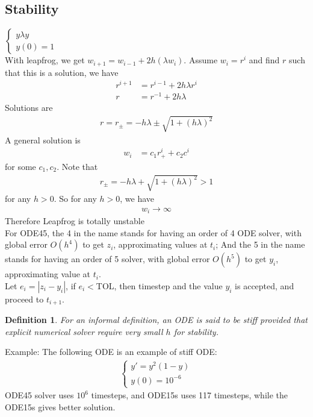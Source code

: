 \documentclass[11pt,oneside]{book}
\theoremstyle{break}
\theoremstyle{break}
\newtheorem{defn}{Definition}[corL]
\newcommand{\example}{\color{purple}Example: \color{black}}
\begin{document}
 \subsection[Stability]{Stability}
 $\begin{cases}
 y\lambda y\\
 y(0)=1
 \end{cases}$\\
 With leapfrog, we get $w_{i+1}=w_{i-1}+2h(\lambda w_i)$. Assume $w_i=r^i$ and find $r$ such that this is a solution, we have \begin{align*}
 r^{i+1}&=r^{i-1}+2h\lambda r^i\\
 r&=r^{-1}+2h\lambda
 \end{align*}
 Solutions are \begin{align*}
 r=r_{\pm} =-h\lambda\pm \sqrt{1+(h\lambda)^2}
 \end{align*}
 A general solution is \begin{align*}
 w_i&=c_1r_{+}^{i}+c_2c^i
 \end{align*}
 for some $c_1,c_2$. Note that \begin{align*}
 r_{\pm}=-h\lambda+\sqrt{1+(h\lambda)^2}>1 
\end{align*}
for any $h>0.$ So for any $h>0$, we have \begin{align*}
w_i\to \infty
\end{align*}
Therefore Leapfrog is totally unstable\\


\newpage
For ODE45, the 4 in the name stands for having an order of 4 ODE solver, with global error $O(h^4)$ to get $z_i$, approximating values at $t_i$; And the 5 in the name stands for having an order of 5 solver, with global error $O(h^5)$ to get $y_i$, approximating value at $t_i$.\\

Let $e_i = |z_i - y_i|$, if $e_i < $TOL, then timestep and the value $y_i$ is accepted, and proceed to $t_{i+1}$. \\

\hfill\break\hfill\break
\begin{defn}
For an informal definition, an ODE is said to be stiff provided that explicit numerical solver require very small $h$ for stability. 
\end{defn}

\example 
The following ODE is an example of stiff ODE:
\begin{align*}
\begin{cases}
y' = y^2(1-y)\\
y(0) = 10^{-6}
\end{cases}
\end{align*}
ODE45 solver uses $10^6$ timesteps, and ODE15s uses 117 timesteps, while the ODE15s gives better solution. 
\end{document}
